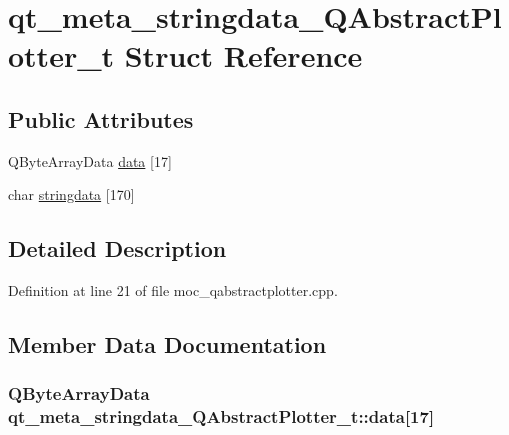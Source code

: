 \hypertarget{structqt__meta__stringdata___q_abstract_plotter__t}{}\section{qt\+\_\+meta\+\_\+stringdata\+\_\+\+Q\+Abstract\+Plotter\+\_\+t Struct Reference}
\label{structqt__meta__stringdata___q_abstract_plotter__t}
\subsection*{Public Attributes}
\begin{DoxyCompactItemize}
\item 
Q\+Byte\+Array\+Data \hyperlink{structqt__meta__stringdata___q_abstract_plotter__t_a852d9ed74df72b47e37224ec3f602e20}{data} \mbox{[}17\mbox{]}
\item 
char \hyperlink{structqt__meta__stringdata___q_abstract_plotter__t_a794cda98d9d1ed6e8fb1035d9c2f2216}{stringdata} \mbox{[}170\mbox{]}
\end{DoxyCompactItemize}


\subsection{Detailed Description}


Definition at line 21 of file moc\+\_\+qabstractplotter.\+cpp.



\subsection{Member Data Documentation}
\hypertarget{structqt__meta__stringdata___q_abstract_plotter__t_a852d9ed74df72b47e37224ec3f602e20}{}
\subsubsection[{data}]{\setlength{\rightskip}{0pt plus 5cm}Q\+Byte\+Array\+Data qt\+\_\+meta\+\_\+stringdata\+\_\+\+Q\+Abstract\+Plotter\+\_\+t\+::data\mbox{[}17\mbox{]}}\label{structqt__meta__stringdata___q_abstract_plotter__t_a852d9ed74df72b47e37224ec3f602e20}


